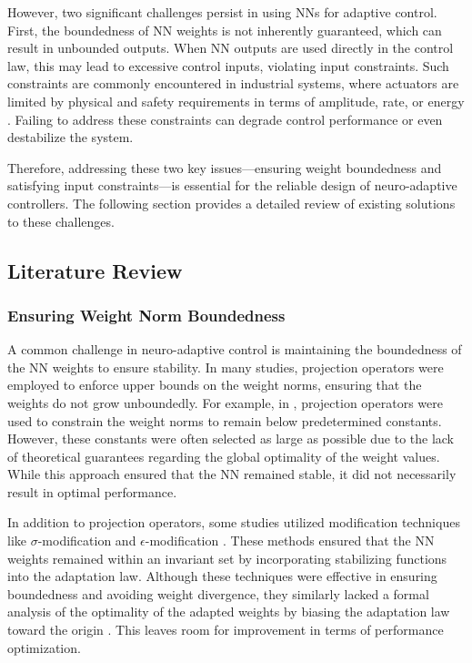 \documentclass[journal]{IEEEtran}
\begin{document}
However, two significant challenges persist in using NNs for adaptive control. 
First, the boundedness of NN weights is not inherently guaranteed, which can result in unbounded outputs. 
When NN outputs are used directly in the control law, this may lead to excessive control inputs, violating input constraints. 
Such constraints are commonly encountered in industrial systems, where actuators are limited by physical and safety requirements in terms of amplitude, rate, or energy \cite{Esfandiari:2021aa}. 
Failing to address these constraints can degrade control performance or even destabilize the system.

Therefore, addressing these two key issues—ensuring weight boundedness and satisfying input constraints—is essential for the reliable design of neuro-adaptive controllers. 
The following section provides a detailed review of existing solutions to these challenges.

\subsection{Literature Review}

\subsubsection{Ensuring Weight Norm Boundedness}

A common challenge in neuro-adaptive control is maintaining the boundedness of the NN weights to ensure stability. 
In many studies, projection operators were employed to enforce upper bounds on the weight norms, ensuring that the weights do not grow unboundedly. 
For example, in \cite{Zhou:2023aa,Griffis:2023aa,Patil:2022aa}, projection operators were used to constrain the weight norms to remain below predetermined constants. 
However, these constants were often selected as large as possible due to the lack of theoretical guarantees regarding the global optimality of the weight values. 
While this approach ensured that the NN remained stable, it did not necessarily result in optimal performance.

In addition to projection operators, some studies utilized modification techniques like $\sigma$-modification \cite{Ge:2002aa} and $\epsilon$-modification \cite{Esfandiari:2015aa,Gao:2006aa}. 
These methods ensured that the NN weights remained within an invariant set by incorporating stabilizing functions into the adaptation law. 
Although these techniques were effective in ensuring boundedness and avoiding weight divergence, they similarly lacked a formal analysis of the optimality of the adapted weights by biasing the adaptation law toward the origin \cite{Ryu:2024aa}.
This leaves room for improvement in terms of performance optimization.
\end{document}
